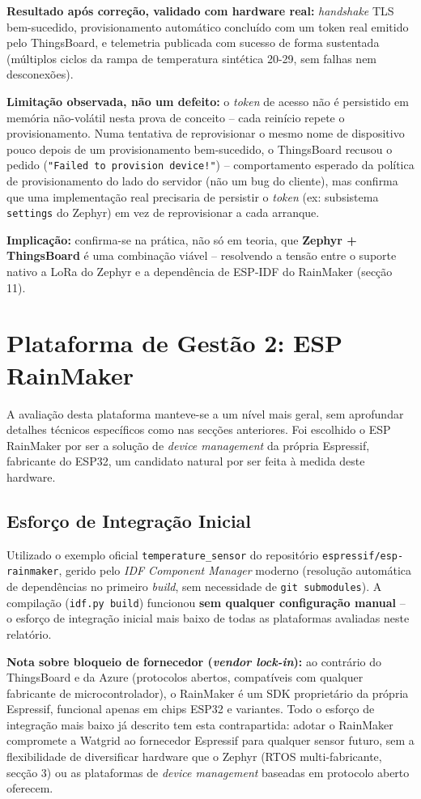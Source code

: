 \documentclass[a4paper,12pt]{article}
\begin{document}
\textbf{Resultado após correção, validado com hardware real:} \textit{handshake} TLS bem-sucedido, provisionamento automático concluído com um token real emitido pelo ThingsBoard, e telemetria publicada com sucesso de forma sustentada (múltiplos ciclos da rampa de temperatura sintética 20-29, sem falhas nem desconexões).

\textbf{Limitação observada, não um defeito:} o \textit{token} de acesso não é persistido em memória não-volátil nesta prova de conceito -- cada reinício repete o provisionamento. Numa tentativa de reprovisionar o mesmo nome de dispositivo pouco depois de um provisionamento bem-sucedido, o ThingsBoard recusou o pedido (\texttt{"Failed to provision device!"}) -- comportamento esperado da política de provisionamento do lado do servidor (não um bug do cliente), mas confirma que uma implementação real precisaria de persistir o \textit{token} (ex: subsistema \texttt{settings} do Zephyr) em vez de reprovisionar a cada arranque.

\textbf{Implicação:} confirma-se na prática, não só em teoria, que \textbf{Zephyr + ThingsBoard} é uma combinação viável -- resolvendo a tensão entre o suporte nativo a LoRa do Zephyr e a dependência de ESP-IDF do RainMaker (secção 11).

\section{Plataforma de Gestão 2: ESP RainMaker}
A avaliação desta plataforma manteve-se a um nível mais geral, sem aprofundar detalhes técnicos específicos como nas secções anteriores. Foi escolhido o ESP RainMaker por ser a solução de \textit{device management} da própria Espressif, fabricante do ESP32, um candidato natural por ser feita à medida deste hardware.

\subsection{Esforço de Integração Inicial}
Utilizado o exemplo oficial \texttt{temperature\_sensor} do repositório \texttt{espressif/esp-rainmaker}, gerido pelo \textit{IDF Component Manager} moderno (resolução automática de dependências no primeiro \textit{build}, sem necessidade de \texttt{git submodules}). A compilação (\texttt{idf.py build}) funcionou \textbf{sem qualquer configuração manual} -- o esforço de integração inicial mais baixo de todas as plataformas avaliadas neste relatório.

\textbf{Nota sobre bloqueio de fornecedor (\textit{vendor lock-in}):} ao contrário do ThingsBoard e da Azure (protocolos abertos, compatíveis com qualquer fabricante de microcontrolador), o RainMaker é um SDK proprietário da própria Espressif, funcional apenas em chips ESP32 e variantes. Todo o esforço de integração mais baixo já descrito tem esta contrapartida: adotar o RainMaker compromete a Watgrid ao fornecedor Espressif para qualquer sensor futuro, sem a flexibilidade de diversificar hardware que o Zephyr (RTOS multi-fabricante, secção 3) ou as plataformas de \textit{device management} baseadas em protocolo aberto oferecem.
\end{document}
